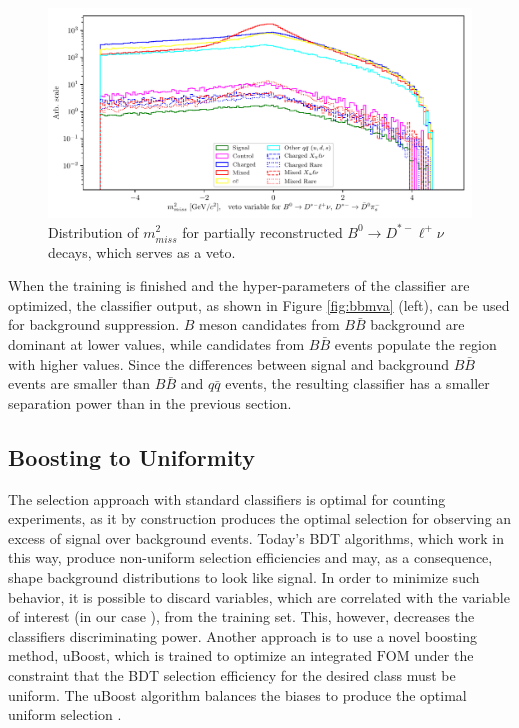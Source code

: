 \begin{figure}[H]
	\centering
	\captionsetup{width=0.8\linewidth}
	\includegraphics[width=\linewidth]{fig/bb_partial_veto}
	\caption{Distribution of $m_{miss}^2$ for partially reconstructed $B^0 \to D^{*-} \ell^+ \nu$ decays, which serves as a veto.}
	\label{fig:vetoplot}
\end{figure}

When the training is finished and the hyper-parameters of the classifier are optimized, the classifier output, as shown in Figure \ref{fig:bbmva} (left), can be used for background suppression. $B$ meson candidates from $B \bar B$ background are dominant at lower values, while candidates from $B \bar B$ events populate the region with higher values. Since the differences between signal and background $B \bar B$ events are smaller than $B \bar B$ and $q \bar q$ events, the resulting classifier has a smaller separation power than in the previous section.

\subsection{Boosting to Uniformity}
The selection approach with standard classifiers is optimal for counting experiments, as it by construction produces the optimal selection for observing an excess of signal over background events. Today's BDT algorithms, which work in this way, produce non-uniform selection efficiencies and may, as a consequence, shape background distributions to look like signal. In order to minimize such behavior, it is possible to discard variables, which are correlated with the variable of interest (in our case \vars), from the training set. This, however, decreases the classifiers discriminating power. Another approach is to use a novel boosting method, uBoost, which is trained to optimize an integrated $\mathrm{FOM}$ under the constraint that the BDT selection efficiency for the desired class must be uniform. The uBoost algorithm balances the biases to produce the optimal uniform selection \cite{stevens2013uboost}.

